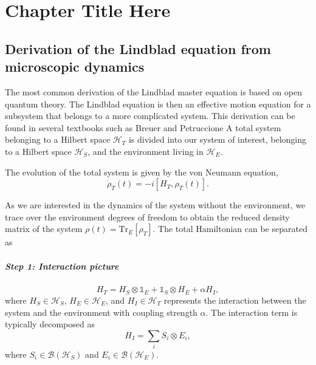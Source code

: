 
\chapter{Chapter Title Here} %

\label{ChapterX} %


\section{Derivation of the Lindblad equation from microscopic dynamics}

The most common derivation of the Lindblad master equation is based on open quantum theory. The Lindblad equation is then an effective motion equation for a subsystem that belongs to a more complicated system. This derivation can be found in several textbooks such as Breuer and Petruccione \cite{breuer_theory_2009} 
A total system belonging to a Hilbert space $\mathcal{H}_T$ is divided into our system of interest, belonging to a Hilbert space $\mathcal{H}_S$, and the environment living in $\mathcal{H}_E$.

The evolution of the total system is given by the von Neumann equation,
\begin{equation}
    \dot{\rho}_T(t) = -i[H_T, \rho_T(t)].
\end{equation}

As we are interested in the dynamics of the system without the environment, we trace over the environment degrees of freedom to obtain the reduced density matrix of the system $\rho(t) = \mathrm{Tr}_E[\rho_T]$. The total Hamiltonian can be separated as

\paragraph{Step 1: Interaction picture}

\begin{equation}
    H_T = H_S \otimes \mathbb{1}_E + \mathbb{1}_S \otimes H_E + \alpha H_I,
\end{equation}
where $H_S \in \mathcal{H}_S$, $H_E \in \mathcal{H}_E$, and $H_I \in \mathcal{H}_T$ represents the interaction between the system and the environment with coupling strength $\alpha$. The interaction term is typically decomposed as
\begin{equation}
    H_I = \sum_i S_i \otimes E_i,
\end{equation}
where $S_i \in \mathcal{B}(\mathcal{H}_S)$ and $E_i \in \mathcal{B}(\mathcal{H}_E)$.

